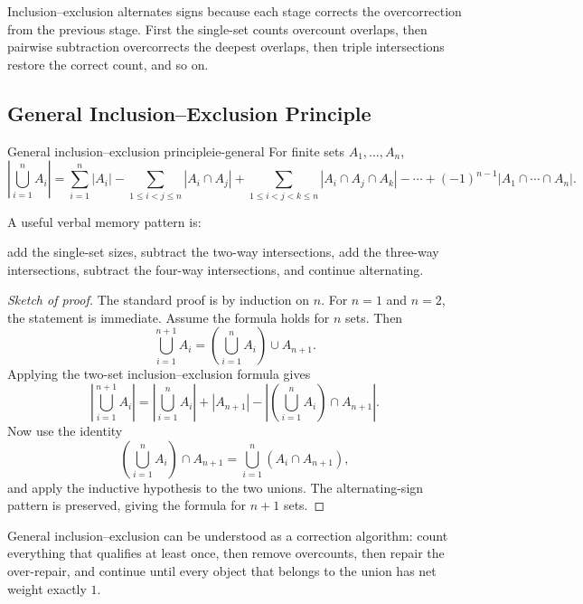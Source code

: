 \begin{extension}[title={Why the signs alternate}]
Inclusion--exclusion alternates signs because each stage corrects the overcorrection from the previous stage. First the single-set counts overcount overlaps, then pairwise subtraction overcorrects the deepest overlaps, then triple intersections restore the correct count, and so on.
\end{extension}

\subsection{General Inclusion--Exclusion Principle}

\begin{theorem}{General inclusion--exclusion principle}{ie-general}
For finite sets $A_1,\dots,A_n$,
\[
\left|\bigcup_{i=1}^n A_i\right|
=
\sum_{i=1}^n |A_i|
-
\sum_{1\le i<j\le n}|A_i\cap A_j|
+
\sum_{1\le i<j<k\le n}|A_i\cap A_j\cap A_k|
-\cdots+
(-1)^{n-1}|A_1\cap\cdots\cap A_n|.
\]
\end{theorem}

A useful verbal memory pattern is:
\begin{center}
add the single-set sizes, subtract the two-way intersections, add the three-way intersections, subtract the four-way intersections, and continue alternating.
\end{center}

\begin{proof}[Sketch of proof]
The standard proof is by induction on $n$.
For $n=1$ and $n=2$, the statement is immediate.
Assume the formula holds for $n$ sets. Then
\[
\bigcup_{i=1}^{n+1}A_i
=
\left(\bigcup_{i=1}^n A_i\right)\cup A_{n+1}.
\]
Applying the two-set inclusion--exclusion formula gives
\[
\left|\bigcup_{i=1}^{n+1}A_i\right|
=
\left|\bigcup_{i=1}^{n}A_i\right|+|A_{n+1}|-
\left|\left(\bigcup_{i=1}^{n}A_i\right)\cap A_{n+1}\right|.
\]
Now use the identity
\[
\left(\bigcup_{i=1}^{n}A_i\right)\cap A_{n+1}
=
\bigcup_{i=1}^{n}(A_i\cap A_{n+1}),
\]
and apply the inductive hypothesis to the two unions. The alternating-sign pattern is preserved, giving the formula for $n+1$ sets.
\end{proof}

\begin{extension}[title={Canonical correction viewpoint}]
General inclusion--exclusion can be understood as a correction algorithm: count everything that qualifies at least once, then remove overcounts, then repair the over-repair, and continue until every object that belongs to the union has net weight exactly $1$.
\end{extension}

